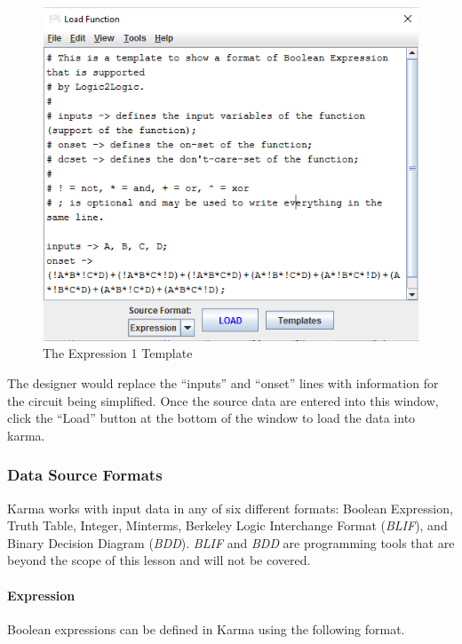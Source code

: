 \begin{figure}[H]
	\centering
	\includegraphics[width=\maxwidth{.95\linewidth}]{gfx/07_03}
	\caption{The Expression 1 Template}
	\label{fig:07_03}
\end{figure}

The designer would replace the ``inputs'' and ``onset'' lines with information for the circuit being simplified. Once the source data are entered into this window, click the ``Load'' button at the bottom of the window to load the data into \gls{karma}.

\subsubsection{Data Source Formats}

Karma works with input data in any of six different formats: Boolean Expression, Truth Table, Integer, Minterms, Berkeley Logic Interchange Format (\textit{BLIF}), and Binary Decision Diagram (\textit{BDD}). \textit{BLIF} and \textit{BDD} are programming tools that are beyond the scope of this lesson and will not be covered.

\paragraph{Expression}

Boolean expressions can be defined in Karma using the following format.


